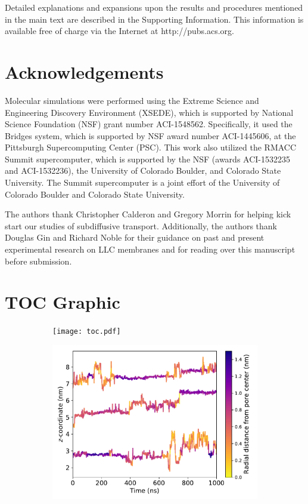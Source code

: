 \documentclass[journal=jpcbfk,manuscript=article]{achemso}
\begin{document}
  Detailed explanations and expansions upon the results and procedures mentioned in
  the main text are described in the Supporting Information. This information is
  available free of charge via the Internet at http://pubs.acs.org.

  \section*{Acknowledgements}

  Molecular simulations were performed using the Extreme Science and
  Engineering Discovery Environment (XSEDE), which is supported by National
  Science Foundation (NSF) grant number ACI-1548562. Specifically, it used the Bridges
  system, which is supported by NSF award number ACI-1445606, at the Pittsburgh
  Supercomputing Center (PSC). This work also utilized the RMACC Summit supercomputer,
  which is supported by the NSF (awards ACI-1532235 and
  ACI-1532236), the University of Colorado Boulder, and Colorado State
  University. The Summit supercomputer is a joint effort of the University of
  Colorado Boulder and Colorado State University.
  
  The authors thank Christopher Calderon and Gregory Morrin for helping kick start
  our studies of subdiffusive transport. Additionally, the authors thank 
  Douglas Gin and Richard Noble for their guidance on past and present experimental
  research on LLC membranes and for reading over this manuscript before submission.

  \clearpage

  
  

  \newpage

  \section*{TOC Graphic}
  
  \begin{figure}[!htb]
  \centering
  \begin{subfigure}{1.35in}
  \texttt{[image: toc.pdf]}
  \end{subfigure}
  \begin{subfigure}{1.9in}
  \vspace{0.075in}
  \includegraphics[width=\linewidth]{colorful_example_ztraces.pdf}
  \end{subfigure}
  \end{figure}
\end{document}

